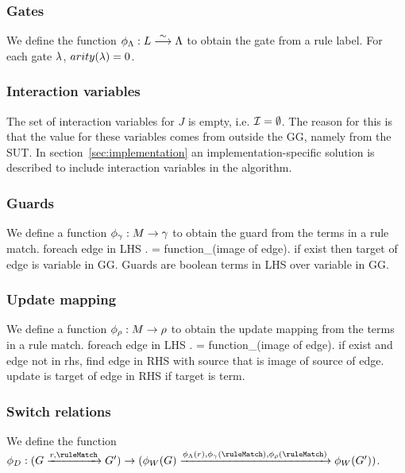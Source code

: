 \subsubsection{Gates}
We define the function $\phi_\Lambda: L \stackrel{\sim}{\longrightarrow} \Lambda$ to obtain the gate from a rule label. For each gate $\lambda$, $arity(\lambda) = 0$.

\subsubsection{Interaction variables}
The set of interaction variables for $J$ is empty, i.e. $\mathcal{I} = \emptyset$. The reason for this is that the value for these variables comes from outside the GG, namely from the SUT. In section~\ref{sec:implementation} an implementation-specific solution is described to include interaction variables in the algorithm. 

\subsubsection{Guards}
We define a function $\phi_\gamma: M \rightarrow \gamma$ to obtain the guard from the terms in a rule match. foreach edge in LHS . \variable = function_\LocationVariables(image of edge). if \variable exist then target of edge is variable in GG. Guards are boolean terms in LHS over variable in GG.

\subsubsection{Update mapping}
We define a function $\phi_\rho: M \rightarrow \rho$ to obtain the update mapping from the terms in a rule match. foreach edge in LHS . \variable = function_\LocationVariables(image of edge). if \variable exist and edge not in rhs, find edge in RHS with source that is image of source of edge. update is \variable \mapsto target of edge in RHS if target is term.

\subsubsection{Switch relations}
We define the function $\function_\Switches: (\hostGraph \xrightarrow{\ggrule, \ruleMatch} \hostGraph') \rightarrow (\function_\Locations(\hostGraph)\xrightarrow{\function_\Gates(\ggrule), \function_\guard(\ruleMatch), \function_\updateMapping(\ruleMatch)}\function_\Locations(\hostGraph'))$.

